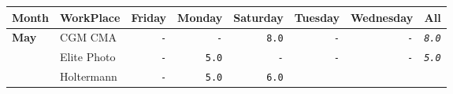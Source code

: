 \documentclass[11pt,A4paper,]{article}
\begin{document}
\begin{longtable}[]{@{}llrrrrrr@{}}
\toprule
Month & WorkPlace & Friday & Monday & Saturday & Tuesday & Wednesday &
All\tabularnewline
\midrule
\endhead
\textbf{May} & CGM CMA & \texttt{-} & \texttt{-} & \texttt{8.0} &
\texttt{-} & \texttt{-} & \emph{\texttt{8.0}}\tabularnewline
\begin{minipage}[t]{0.12\columnwidth}\raggedright\strut
\strut
\end{minipage} & \begin{minipage}[t]{0.12\columnwidth}\raggedright\strut
Elite Photo\strut
\end{minipage} & \begin{minipage}[t]{0.12\columnwidth}\raggedleft\strut
\texttt{-}\strut
\end{minipage} & \begin{minipage}[t]{0.12\columnwidth}\raggedleft\strut
\texttt{5.0}\strut
\end{minipage} & \begin{minipage}[t]{0.12\columnwidth}\raggedleft\strut
\texttt{-}\strut
\end{minipage} & \begin{minipage}[t]{0.12\columnwidth}\raggedleft\strut
\texttt{-}\strut
\end{minipage} & \begin{minipage}[t]{0.12\columnwidth}\raggedleft\strut
\texttt{-}\strut
\end{minipage} & \begin{minipage}[t]{0.12\columnwidth}\raggedleft\strut
\emph{\texttt{5.0}}\strut
\end{minipage}\tabularnewline
\begin{minipage}[t]{0.12\columnwidth}\raggedright\strut
\strut
\end{minipage} & \begin{minipage}[t]{0.12\columnwidth}\raggedright\strut
Holtermann\strut
\end{minipage} & \begin{minipage}[t]{0.12\columnwidth}\raggedleft\strut
\texttt{-}\strut
\end{minipage} & \begin{minipage}[t]{0.12\columnwidth}\raggedleft\strut
\texttt{5.0}\strut
\end{minipage} & \begin{minipage}[t]{0.12\columnwidth}\raggedleft\strut
\texttt{6.0}\strut
\end{minipage} & \begin{minipage}[t]{0.12\columnwidth}\raggedleft\strut

\end{minipage}
\end{longtable}
\end{document}
